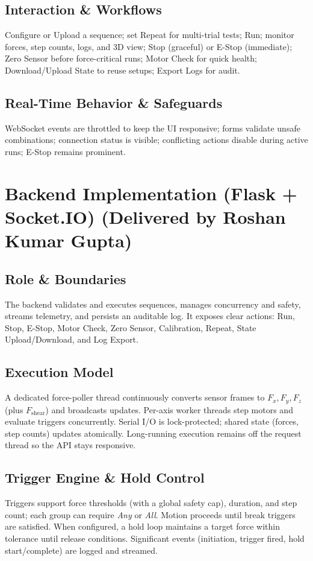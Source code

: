 \documentclass[
    twocolumn,
    fontsize = 10pt,
    parskip = half+,
    headings = small,
    headwidth = text,
    footwidth = text,
]{scrartcl}
\begin{document}
\subsection{Interaction \& Workflows}
Configure or Upload a sequence; set Repeat for multi-trial tests; Run; monitor forces, step counts, logs, and 3D view; Stop (graceful) or E-Stop (immediate); Zero Sensor before force-critical runs; Motor Check for quick health; Download/Upload State to reuse setups; Export Logs for audit.

\subsection{Real-Time Behavior \& Safeguards}
WebSocket events are throttled to keep the UI responsive; forms validate unsafe combinations; connection status is visible; conflicting actions disable during active runs; E-Stop remains prominent.


\section{Backend Implementation (Flask + Socket.IO) \textnormal{(Delivered by Roshan Kumar Gupta)}}
\label{sec:backend}

\subsection{Role \& Boundaries}
The backend validates and executes sequences, manages concurrency and safety, streams telemetry, and persists an auditable log. It exposes clear actions: Run, Stop, E-Stop, Motor Check, Zero Sensor, Calibration, Repeat, State Upload/Download, and Log Export.

\subsection{Execution Model}
A dedicated force-poller thread continuously converts sensor frames to $F_x, F_y, F_z$ (plus $F_{\text{shear}}$) and broadcasts updates. Per-axis worker threads step motors and evaluate triggers concurrently. Serial I/O is lock-protected; shared state (forces, step counts) updates atomically. Long-running execution remains off the request thread so the API stays responsive.

\subsection{Trigger Engine \& Hold Control}
Triggers support force thresholds (with a global safety cap), duration, and step count; each group can require \emph{Any} or \emph{All}. Motion proceeds until break triggers are satisfied. When configured, a hold loop maintains a target force within tolerance until release conditions. Significant events (initiation, trigger fired, hold start/complete) are logged and streamed.
\end{document}
